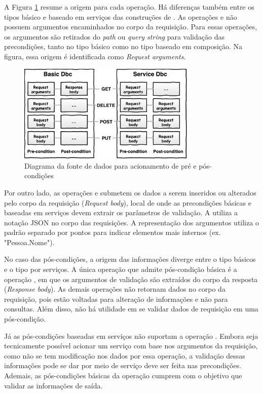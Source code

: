 A Figura \ref{Fig:FonteDadosDbcNeoIDL} resume a origem para cada operação. Há
diferenças também entre os tipos básico e baseado em serviços das construções de
\designbycontract{}. As operações  e  não possuem
argumentos encaminhados no corpo da requisição. Para essas operações, os
argumentos são retirados do \emph{path} ou \emph{query string} para
va\-li\-da\-ção das precondições, tanto no tipo básico como no tipo baseado em
composição. Na figura, essa origem é identificada como \textit{Request arguments}.

\begin{figure}[!htb]
\centering
\includegraphics[width=85mm,trim = 0mm 0mm 0mm
0mm,clip]{img/FonteDadosDbcNeoIDLIngles.pdf}
\caption{Diagrama da fonte de dados para acionamento de pré e pós-condições}
\label{Fig:FonteDadosDbcNeoIDL}
\end{figure}


Por outro lado, as operações  e  submetem os dados a
serem inseridos ou alterados pelo corpo da requisição (\textit{Request body}),
local de onde as precondições básicas e baseadas em serviços devem extrair os
parâmetros de validação.
A \neoidl{} utiliza a notação JSON\cite{JSon} no corpo das requisições. A
representação dos argumentos utiliza o padrão separado por pontos para indicar
elementos mais internos (ex. "Pessoa.Nome").

No caso das pós-condições, a origem das informações diverge entre o tipo
básicos e o tipo por serviços. A única operação que admite pós-condição básica é
a operação , em que os argumentos de validação são extraídos do
corpo da resposta (\textit{Response body}). As demais operações não retornam dados
no corpo da requisição, pois estão voltadas para alteração de informações e não
para consultas. Além disso, não há utilidade em se validar dados de requisição
em uma pós-condição.

Já as pós-condições baseadas em serviços não suportam a operação .
Embora seja tecnicamente possível acionar um serviço com base nos argumentos da
requisição, como não se tem modificação nos dados por essa operação, a
validação dessas informações pode se dar por meio de serviço deve ser feita nas
precondições. Ademais, as pós-condições básicas da operação  cumprem
com o objetivo que validar as informações de saída.

